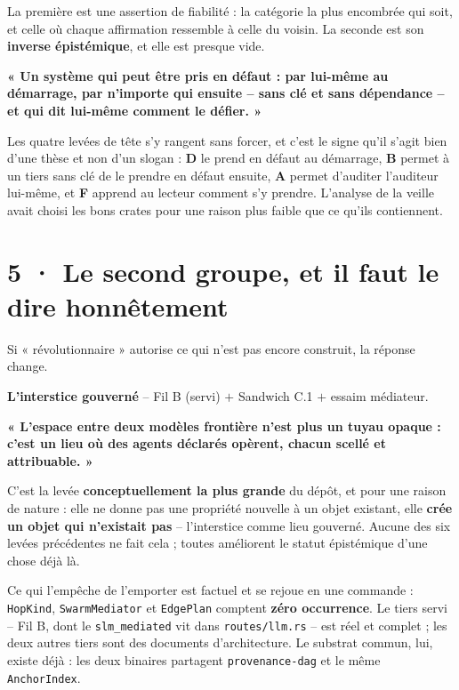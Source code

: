 \documentclass[10pt]{article}
\newcommand{\code}[1]{\texttt{\small #1}}
\begin{document}
La première est une assertion de fiabilité : la catégorie la plus encombrée qui soit, et celle où
chaque affirmation ressemble à celle du voisin. La seconde est son \textbf{inverse épistémique}, et
elle est presque vide.

\begin{piste}
\textbf{« Un système qui peut être pris en défaut : par lui-même au démarrage, par n'importe qui
ensuite -- sans clé et sans dépendance -- et qui dit lui-même comment le défier. »}
\end{piste}

Les quatre levées de tête s'y rangent sans forcer, et c'est le signe qu'il s'agit bien d'une thèse et
non d'un slogan : \textbf{D} le prend en défaut au démarrage, \textbf{B} permet à un tiers sans clé de
le prendre en défaut ensuite, \textbf{A} permet d'auditer l'auditeur lui-même, et \textbf{F} apprend au
lecteur comment s'y prendre. L'analyse de la veille avait choisi les bons crates pour une raison plus
faible que ce qu'ils contiennent.

\section{5 · Le second groupe, et il faut le dire honnêtement}

Si « révolutionnaire » autorise ce qui n'est pas encore construit, la réponse change.

\textbf{L'interstice gouverné} -- Fil B (servi) $+$ Sandwich C.1 $+$ essaim médiateur.

\begin{piste}
\textbf{« L'espace entre deux modèles frontière n'est plus un tuyau opaque : c'est un lieu où des
agents déclarés opèrent, chacun scellé et attribuable. »}
\end{piste}

C'est la levée \textbf{conceptuellement la plus grande} du dépôt, et pour une raison de nature : elle
ne donne pas une propriété nouvelle à un objet existant, elle \textbf{crée un objet qui n'existait
pas} -- l'interstice comme lieu gouverné. Aucune des six levées précédentes ne fait cela ; toutes
améliorent le statut épistémique d'une chose déjà là.

Ce qui l'empêche de l'emporter est factuel et se rejoue en une commande : \code{HopKind},
\code{SwarmMediator} et \code{EdgePlan} comptent \textbf{zéro occurrence}. Le tiers servi -- Fil B, dont
le \code{slm\_mediated} vit dans \code{routes/llm.rs} -- est réel et complet ; les deux autres tiers
sont des documents d'architecture. Le substrat commun, lui, existe déjà : les deux binaires partagent
\code{provenance-dag} et le même \code{AnchorIndex}.
\end{document}

